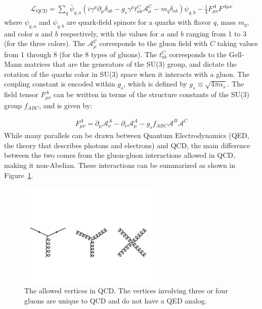 \begin{align}
\mathcal{{L}}_{\mathrm{QCD}} = \sum_q \bar{\psi}_{q,a} (i \gamma^\mu \partial_\mu \delta_{ab} - g_s \gamma^\mu t_{ab}^C \mathcal{A}_\mu^C - m_q \delta_{ab}) \psi_{q,b} - \frac{1}{4} F_{\mu\nu}^A F^{A \mu\nu}
\end{align}
where $\psi_{q,a}$ and $\psi_{q,b}$ are quark-field spinors for a quarks with flavor $q$, mass $m_q$, and color $a$ and $b$ respectively, with the values for $a$ and $b$ ranging  from 1 to 3 (for the three colors).
The $\mathcal{A_\mu^C}$ corresponds to the gluon field with $C$ taking values from 1 through 8 (for the 8 types of gluons).
The $t_{ab}^C$ corresponds to the Gell-Mann matrices that are the generators of the SU(3) group, and dictate the rotation of the quarks color in SU(3) space when it interacts with a gluon.
The coupling constant is encoded within $g_s$, which is defined by $g_s \equiv \sqrt{4 \pi \alpha_s}$.
The field tensor $F_{\mu\nu}^A$ can be written in terms of the structure constants of the SU(3) group $f_{ABC}$, and is given by:

\begin{align}
F_{\mu\nu}^A = \partial_\mu \mathcal{A}_\nu^A - \partial_\nu \mathcal{A}_\mu^A - g_s f_{ABC} \mathcal{A}^B \mathcal{A}^C
\end{align}
While many parallels can be drawn between Quantum Electrodynamics (QED, the theory that describes photons and electrons) and QCD, the main difference between the two comes from the gluon-gluon interactions allowed in QCD, making it non-Abelian.
These interactions can be summarized as shown in Figure~\ref{fig:qcd_diagrams}.

\begin{figure}[htbp]
\begin{center}
\includegraphics[width=0.6\textwidth]{figures/theory/qcd_diagrams}
\caption{The allowed vertices in QCD.
The vertices involving three or four gluons are unique to QCD and do not have a QED analog.}
\label{fig:qcd_diagrams}
\end{center}
\end{figure}

